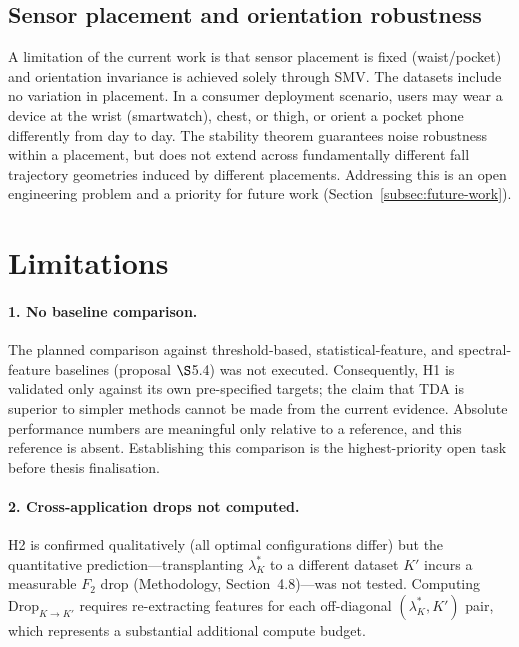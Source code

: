 \documentclass[onluarkali,ingilizce,yukseklisans,karton,LisansustuEgitim]{itutez}
\providecommand{\1}{\mathbf{1}}
\begin{document}
\subsection{Sensor placement and orientation robustness}

A limitation of the current work is that sensor placement is fixed (waist/pocket) and
orientation invariance is achieved solely through SMV.  The datasets include no
variation in placement.  In a consumer deployment scenario, users may wear a device
at the wrist (smartwatch), chest, or thigh, or orient a pocket phone differently from
day to day.  The stability theorem guarantees noise robustness within a placement, but
does not extend across fundamentally different fall trajectory geometries induced by
different placements.  Addressing this is an open engineering problem and a priority
for future work (Section~\ref{subsec:future-work}).

\section{Limitations}
\label{subsec:limitations}

\paragraph{1. No baseline comparison.}
The planned comparison against threshold-based, statistical-feature, and spectral-feature
baselines (proposal $\S$5.4) was not executed.  Consequently, H1 is validated only
against its own pre-specified targets; the claim that TDA is superior to simpler
methods cannot be made from the current evidence.  Absolute performance numbers are
meaningful only relative to a reference, and this reference is absent.  Establishing
this comparison is the highest-priority open task before thesis finalisation.

\paragraph{2. Cross-application drops not computed.}
H2 is confirmed qualitatively (all optimal configurations differ) but the quantitative
prediction---transplanting $\lambda^*_K$ to a different dataset $K'$ incurs a
measurable $F_2$ drop (Methodology, Section~4.8)---was not tested.  Computing
$\mathrm{Drop}_{K\to K'}$ requires re-extracting features for each off-diagonal
$(\lambda^*_K, K')$ pair, which represents a substantial additional compute budget.
\end{document}
